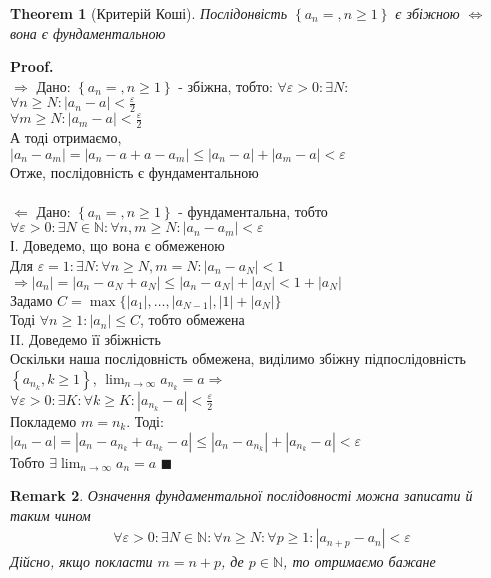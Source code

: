 \documentclass[a4paper, 14pt]{extarticle}
\def\huge{\displaystyle}
\def\bigline{\vspace{5mm}\\}
\newcommand{\sequence}[2][{}]{%
\ifthenelse{\equal{#1}{}}{$\{{#2}, n \geq 1 \}$}
{$\huge \left\{ {#2} = {#1}, n \geq 1 \right\}$}%
}
\theoremstyle{theoremdd}
\newtheorem{theorem}{Theorem}[subsection]
\theoremstyle{theoremdd}
\theoremstyle{theoremdd}
\theoremstyle{theoremdd}
\theoremstyle{theoremdd}
\theoremstyle{theoremdd}
\newtheorem{remark}[theorem]{Remark}
\theoremstyle{theoremdd}
\theoremstyle{theoremdd}
\newenvironment{pf}{\vspace*{-3mm} \textbf{Proof. \\}}{$\blacksquare$}
\def\subsequence#1{$\displaystyle \left\{ {#1}, k\geq1 \right\}$}
\begin{document}
	\begin{theorem}[Критерій Коші]
	Послідонвість \sequence{a_n} є збіжною $\iff$ вона є фундаментальною
	\end{theorem}
	\begin{pf}
	$\boxed{\Rightarrow}$ Дано: \sequence{a_n} - збіжна, тобто: $\forall \varepsilon >0: \exists N: $\\
	$\huge \forall n \geq N: |a_n - a| < \frac{\varepsilon}{2}$\\
	$\huge \forall m \geq N: |a_m - a| < \frac{\varepsilon}{2}$\\
	А тоді отримаємо,\\
	$|a_n - a_m| = |a_n - a + a - a_m| \leq |a_n - a| + |a_m - a| < \varepsilon$\\
	Отже, послідовність є фундаментальною\\
	\\
	$\boxed{\Leftarrow}$ Дано: \sequence{a_n} - фундаментальна, тобто\\
	$\forall \varepsilon > 0: \exists N \in \mathbb{N}: \forall n,m \geq N: |a_n - a_m| < \varepsilon$\\
	І. Доведемо, що вона є обмеженою\\
	Для $\varepsilon = 1: \exists N: \forall n \geq N, m = N: |a_n - a_N| < 1$\\
	$\Rightarrow |a_n| = |a_n - a_N + a_N| \leq |a_n - a_N| + |a_N| < 1 + |a_N|$\\
	Задамо $C = \max\{|a_1|, \dots, |a_{N-1}|, |1|+|a_N|\}$\\
	Тоді $\forall n \geq 1: |a_n| \leq C$, тобто обмежена
	\bigline
	II. Доведемо її збіжність\\
	Оскільки наша послідовність обмежена, виділимо збіжну підпослідовність \subsequence{a_{n_k}}, $\huge \lim_{n \to \infty} a_{n_k} = a \Rightarrow$\\
	$\huge \forall \varepsilon > 0: \exists K: \forall k \geq K: |a_{n_k} - a| < \frac{\varepsilon}{2}$\\
	Покладемо $m = n_k$. Тоді:\\
	$|a_n - a| = |a_n - a_{n_k} + a_{n_k} - a| \leq |a_n - a_{n_k}| + |a_{n_k} - a| < \varepsilon$\\
	Тобто $\huge \exists \lim_{n \to \infty} a_n = a$
	\end{pf}
	
	\begin{remark}
	Означення фундаментальної послідовності можна записати й таким чином
	\begin{align*}
	\forall \varepsilon > 0: \exists N \in \mathbb{N}: \forall n \geq N: \forall p \geq 1: |a_{n+p} - a_n| < \varepsilon
	\end{align*}
	Дійсно, якщо покласти $m = n + p$, де $p \in \mathbb{N}$, то отримаємо бажане
	\end{remark}
	
\end{document}
